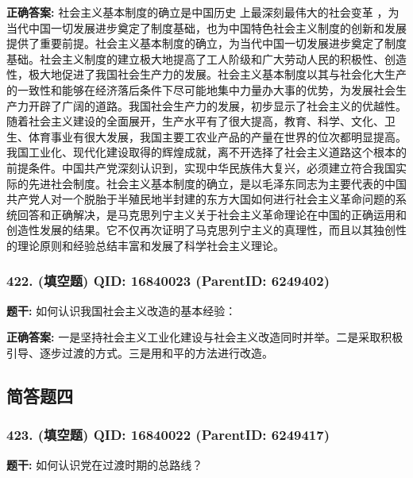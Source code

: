 \documentclass[12pt,UTF8]{ctexart}
\begin{document}
\textbf{正确答案:}
社会主义基本制度的确立是中国历史 上最深刻最伟大的社会变革 ，为当代中国一切发展进步奠定了制度基础，也为中国特色社会主义制度的创新和发展提供了重要前提。社会主义基本制度的确立，为当代中国一切发展进步奠定了制度基础。社会主义制度的建立极大地提高了工人阶级和广大劳动人民的积极性、创造性，极大地促进了我国社会生产力的发展。社会主义基本制度以其与社会化大生产的一致性和能够在经济落后条件下尽可能地集中力量办大事的优势，为发展社会生产力开辟了广阔的道路。我国社会生产力的发展，初步显示了社会主义的优越性。随着社会主义建设的全面展开，生产水平有了很大提高，教育、科学、文化、卫生、体育事业有很大发展，我国主要工农业产品的产量在世界的位次都明显提高。我国工业化、现代化建设取得的辉煌成就，离不开选择了社会主义道路这个根本的前提条件。中国共产党深刻认识到，实现中华民族伟大复兴，必须建立符合我国实际的先进社会制度。社会主义基本制度的确立，是以毛泽东同志为主要代表的中国共产党人对一个脱胎于半殖民地半封建的东方大国如何进行社会主义革命问题的系统回答和正确解决，是马克思列宁主义关于社会主义革命理论在中国的正确运用和创造性发展的结果。它不仅再次证明了马克思列宁主义的真理性，而且以其独创性的理论原则和经验总结丰富和发展了科学社会主义理论。

\vspace{0.3em}\hrulefill\vspace{0.7em}

\subsubsection*{422. (填空题) \small QID: 16840023 (ParentID: 6249402)}

\textbf{题干:}
如何认识我国社会主义改造的基本经验：



\textbf{正确答案:}
一是坚持社会主义工业化建设与社会主义改造同时并举。二是采取积极引导、逐步过渡的方式。三是用和平的方法进行改造。

\vspace{0.3em}\hrulefill\vspace{0.7em}

\subsection*{简答题四}

\subsubsection*{423. (填空题) \small QID: 16840022 (ParentID: 6249417)}

\textbf{题干:}
如何认识党在过渡时期的总路线？
\end{document}
